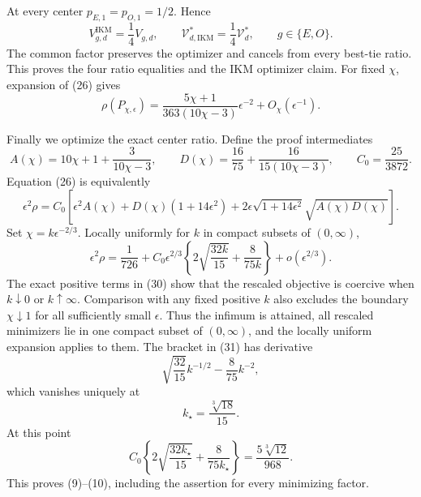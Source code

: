 At every center \(p_{E,1}=p_{O,1}=1/2\). Hence
\[
 V_{g,d}^{\mathrm{IKM}}=\frac{1}{4}V_{g,d},
 \qquad
 \mathcal V_{d,\mathrm{IKM}}^*=\frac{1}{4}\mathcal V_d^*,
 \qquad g\in\{E,O\}.                                    \tag{28}
\]
The common factor preserves the optimizer and cancels from every best-tie ratio. This proves the four ratio equalities and the IKM optimizer claim. For fixed \(\chi\), expansion of (26) gives
\[
 \rho(P_{\chi,\epsilon})
 =\frac{5\chi+1}{363(10\chi-3)}\epsilon^{-2}
 +O_\chi(\epsilon^{-1}).                                  \tag{29}
\]

Finally we optimize the exact center ratio. Define the proof intermediates
\[
 A(\chi)=10\chi+1+\frac{3}{10\chi-3},
 \qquad
 D(\chi)=\frac{16}{75}+\frac{16}{15(10\chi-3)},
 \qquad C_0=\frac{25}{3872}.
\]
Equation (26) is equivalently
\[
 \epsilon^2\rho
 =C_0\left[
 \epsilon^2A(\chi)+D(\chi)(1+14\epsilon^2)
 +2\epsilon\sqrt{1+14\epsilon^2}\sqrt{A(\chi)D(\chi)}
 \right].                                                 \tag{30}
\]
Set \(\chi=k\epsilon^{-2/3}\). Locally uniformly for \(k\) in compact subsets of \((0,\infty)\),
\[
 \epsilon^2\rho
 =\frac{1}{726}+C_0\epsilon^{2/3}
 \left\{2\sqrt{\frac{32k}{15}}+\frac{8}{75k}\right\}
 +o(\epsilon^{2/3}).                                      \tag{31}
\]
The exact positive terms in (30) show that the rescaled objective is coercive when \(k\downarrow0\) or \(k\uparrow\infty\). Comparison with any fixed positive \(k\) also excludes the boundary \(\chi\downarrow1\) for all sufficiently small \(\epsilon\). Thus the infimum is attained, all rescaled minimizers lie in one compact subset of \((0,\infty)\), and the locally uniform expansion applies to them. The bracket in (31) has derivative
\[
 \sqrt{\frac{32}{15}}k^{-1/2}-\frac{8}{75}k^{-2},
\]
which vanishes uniquely at
\[
 k_\star=\frac{\sqrt[3]{18}}{15}.
\]
At this point
\[
 C_0\left\{2\sqrt{\frac{32k_\star}{15}}+\frac{8}{75k_\star}\right\}
 =\frac{5\sqrt[3]{12}}{968}.
\]
This proves (9)--(10), including the assertion for every minimizing factor.